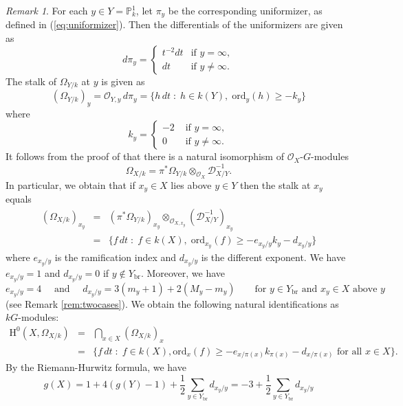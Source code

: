 \documentclass{amsart}
\numberwithin{equation}{section}
\numberwithin{table}{section}
\theoremstyle{plain}
\theoremstyle{definition}
\theoremstyle{remark}
\newtheorem{remark}[theorem]{Remark}
\newcommand{\HH}{\mathrm{H}}
\begin{document}
\begin{remark}
\label{rem:holodiffoverP1}
For each $y\in Y=\mathbb{P}^1_k$, let $\pi_y$ be the corresponding uniformizer, as defined in (\ref{eq:uniformizer}). 
Then the differentials of the uniformizers are given as
\begin{equation}
\label{eq:diffuni}
d\pi_y = \left\{\begin{array}{cl} t^{-2} dt & \mbox{if } y=\infty,\\
dt & \mbox{if } y\neq \infty.
\end{array}\right.
\end{equation}
The stalk of $\Omega_{Y/k}$ at $y$ is given as
$$(\Omega_{Y/k})_y=\mathcal{O}_{Y,y}\,d\pi_y = \{ h\,dt\; : \; h \in k(Y), \; \mathrm{ord}_y(h) \ge -k_y\}$$
where 
\begin{equation}
\label{eq:ky}
k_y = \left\{\begin{array}{rl}
-2 & \mbox{ if $y=\infty$},\\
0 & \mbox{ if $y\ne \infty$}.
\end{array}\right.
\end{equation}
It follows from the proof of \cite[Proposition IV.2.3]{Hartshorne1977} that there is a natural isomorphism of $\mathcal{O}_X$-$G$-modules
$$\Omega_{X/k} = \pi^* \Omega_{Y/k}\otimes_{\mathcal{O}_X} \mathcal{D}_{X/Y}^{-1}.$$
In particular, we obtain that if $x_y\in X$ lies above $y\in Y$ then the stalk at $x_y$ equals
\begin{eqnarray*}
(\Omega_{X/k})_{x_y} &=& (\pi^* \Omega_{Y/k})_{x_y}\otimes_{\mathcal{O}_{X,x_y}} (\mathcal{D}_{X/Y}^{-1})_{x_y}\\
&=& \{ f\,dt\; : \; f \in k(X), \; \mathrm{ord}_{x_y}(f) \ge -e_{x_y/y}k_y-d_{x_y/y}\}
\end{eqnarray*}
where $e_{x_y/y}$ is the ramification index and $d_{x_y/y}$ is the different exponent. We have $e_{x_y/y}=1$ and $d_{x_y/y}=0$ if $y\not\in Y_{\mathrm{br}}$. Moreover, we have
\begin{equation}
\label{eq:differentP1}
e_{x_y/y} = 4\quad\mbox{ and }\quad d_{x_y/y} = 3(m_y+1)+2(M_y-m_y) \qquad \mbox{for $y\in Y_{\mathrm{br}}$ and $x_y\in X$ above $y$}
\end{equation}
(see Remark \ref{rem:twocases}).
We obtain the following natural identifications as $kG$-modules:
\begin{eqnarray*}
\HH^0(X,\Omega_{X/k}) &=& \bigcap_{x\in X} (\Omega_{X/k})_x\\
&=& \{ f\,dt\; : \; f \in k(X), \mathrm{ord}_x(f) \ge -e_{x/\pi(x)}k_{\pi(x)}-d_{x/\pi(x)} \mbox{ for all } x\in X\}.
\end{eqnarray*}
By the Riemann-Hurwitz formula, we have
\begin{equation}
\label{eq:genus}
g(X) = 1+4(g(Y)-1) + \frac{1}{2} \sum_{y\in Y_{\mathrm{br}}} d_{x_y/y}= -3 + \frac{1}{2} \sum_{y\in Y_{\mathrm{br}}} d_{x_y/y}
\end{equation}
\end{remark}
\end{document}
